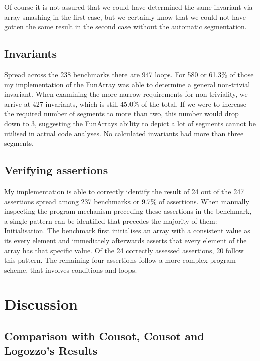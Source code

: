 \noindent Of course it is not assured that we could have determined the same invariant via array smashing in the first case, but we certainly know that we could not have gotten the same result in the second case without the automatic segmentation.


\subsection{Invariants}

Spread across the 238 benchmarks there are 947 loops. For 580 or 61.3\% of those my implementation of the FunArray was able to determine a general non-trivial invariant. When examining the more narrow requirements for non-triviality, we arrive at 427 invariants, which is still 45.0\% of the total. If we were to increase the required number of segments to more than two, this number would drop down to 3, suggesting the FunArrays ability to depict a lot of segments cannot be utilised in actual code analyses. No calculated invariants had more than three segments.

\subsection{Verifying assertions}

My implementation is able to correctly identify the result of 24 out of the 247 assertions spread among 237 benchmarks or 9.7\% of assertions. When manually inspecting the program mechanism preceding these assertions in the benchmark, a single pattern can be identified that precedes the majority of them: Initialisation. The benchmark first initialises an array with a consistent value as its every element and immediately afterwards asserts that every element of the array has that specific value. Of the 24 correctly assessed assertions, 20 follow this pattern. The remaining four assertions follow a more complex program scheme, that involves conditions and loops.



\section{Discussion}
\subsection{Comparison with Cousot, Cousot and Logozzo's Results}

